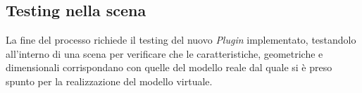 \subsection{Testing nella scena}
La fine del processo richiede il testing del nuovo \emph{Plugin} implementato, testandolo all'interno
di una scena per verificare che le caratteristiche, geometriche e dimensionali corrispondano con quelle
del modello reale dal quale si è preso spunto per la realizzazione del modello virtuale.\\
